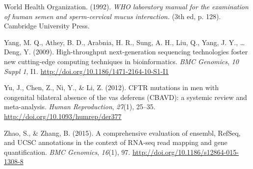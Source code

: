\documentclass[12pt,twoside]{reedthesis}
\theoremstyle{definition}
\theoremstyle{definition}
\theoremstyle{remark}
\begin{document}
  \hypertarget{ref-WorldHealthOrganization1992}{}
  World Health Organization. (1992). \emph{WHO laboratory manual for the
  examination of human semen and sperm-cervical mucus interaction.} (3th
  ed, p. 128). Cambridge University Press.
  
  \hypertarget{ref-Yang2009}{}
  Yang, M. Q., Athey, B. D., Arabnia, H. R., Sung, A. H., Liu, Q., Yang,
  J. Y., \ldots{} Deng, Y. (2009). High-throughput next-generation
  sequencing technologies foster new cutting-edge computing techniques in
  bioinformatics. \emph{BMC Genomics}, \emph{10 Suppl 1}, I1.
  \url{http://doi.org/10.1186/1471-2164-10-S1-I1}
  
  \hypertarget{ref-Yu2012}{}
  Yu, J., Chen, Z., Ni, Y., \& Li, Z. (2012). CFTR mutations in men with
  congenital bilateral absence of the vas deferens (CBAVD): a systemic
  review and meta-analysis. \emph{Human Reproduction}, \emph{27}(1),
  25--35. \url{http://doi.org/10.1093/humrep/der377}
  
  \hypertarget{ref-Zhao2015}{}
  Zhao, S., \& Zhang, B. (2015). A comprehensive evaluation of ensembl,
  RefSeq, and UCSC annotations in the context of RNA-seq read mapping and
  gene quantification. \emph{BMC Genomics}, \emph{16}(1), 97.
  \url{http://doi.org/10.1186/s12864-015-1308-8}


\end{document}
